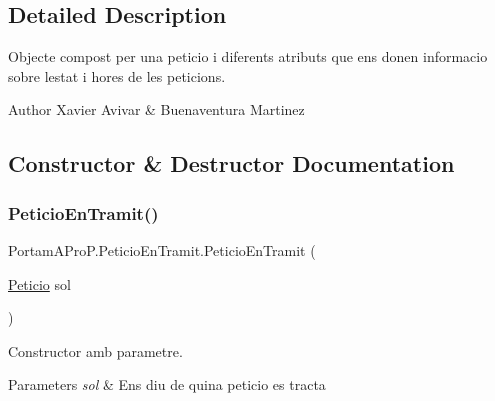 \subsection{Detailed Description}
Objecte compost per una peticio i diferents atributs que ens donen informacio sobre l\textquotesingle{}estat i hores de les peticions. 

\begin{DoxyAuthor}{Author}
Xavier Avivar \& Buenaventura Martinez 
\end{DoxyAuthor}


\subsection{Constructor \& Destructor Documentation}
\mbox{\label{class_portam_a_pro_p_1_1_peticio_en_tramit_aa9d9149506e4fdc9b095a3a9871ce414}} 
\subsubsection{\texorpdfstring{Peticio\+En\+Tramit()}{PeticioEnTramit()}\hspace{0.1cm}{\footnotesize\ttfamily [1/2]}}
{\footnotesize\ttfamily Portam\+A\+Pro\+P.\+Peticio\+En\+Tramit.\+Peticio\+En\+Tramit (\begin{DoxyParamCaption}\item[{\hyperlink{class_portam_a_pro_p_1_1_peticio}{Peticio}}]{sol }\end{DoxyParamCaption})}



Constructor amb parametre. 


\begin{DoxyParams}{Parameters}
{\em sol} & Ens diu de quina peticio es tracta \\
\hline
\end{DoxyParams}
\mbox{\label{class_portam_a_pro_p_1_1_peticio_en_tramit_a9b7bf21f0a66ecaebc948d4870aaeb80}} 
